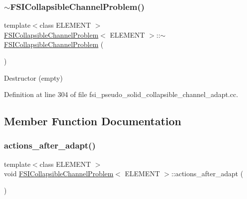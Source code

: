 \subsubsection{\texorpdfstring{$\sim$\+F\+S\+I\+Collapsible\+Channel\+Problem()}{~FSICollapsibleChannelProblem()}\hspace{0.1cm}{\footnotesize\ttfamily [4/4]}}
{\footnotesize\ttfamily template$<$class E\+L\+E\+M\+E\+NT $>$ \\
\hyperlink{classFSICollapsibleChannelProblem}{F\+S\+I\+Collapsible\+Channel\+Problem}$<$ E\+L\+E\+M\+E\+NT $>$\+::$\sim$\hyperlink{classFSICollapsibleChannelProblem}{F\+S\+I\+Collapsible\+Channel\+Problem} (\begin{DoxyParamCaption}{ }\end{DoxyParamCaption})\hspace{0.3cm}{\ttfamily [inline]}}



Destructor (empty) 



Definition at line 304 of file fsi\+\_\+pseudo\+\_\+solid\+\_\+collapsible\+\_\+channel\+\_\+adapt.\+cc.



\subsection{Member Function Documentation}
\mbox{\label{classFSICollapsibleChannelProblem_ae20eb7ed895e0063ade5a6d0c6f9af2f}} 
\subsubsection{\texorpdfstring{actions\+\_\+after\+\_\+adapt()}{actions\_after\_adapt()}\hspace{0.1cm}{\footnotesize\ttfamily [1/2]}}
{\footnotesize\ttfamily template$<$class E\+L\+E\+M\+E\+NT $>$ \\
void \hyperlink{classFSICollapsibleChannelProblem}{F\+S\+I\+Collapsible\+Channel\+Problem}$<$ E\+L\+E\+M\+E\+NT $>$\+::actions\+\_\+after\+\_\+adapt (\begin{DoxyParamCaption}{ }\end{DoxyParamCaption})}



